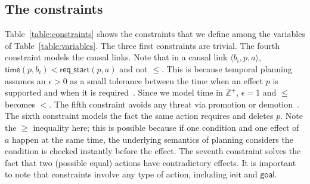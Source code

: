 \documentclass[runningheads]{llncs}
\newcommand{\tup}[1]{{\langle #1 \rangle}}
\newcommand{\dur}{\mathsf{dur}}    %
\newcommand{\obs}{\mathsf{obs}}    %
\newcommand{\start}{\mathsf{start}}%
\newcommand{\til}{\mathsf{til}}    %
\newcommand{\tim}{\mathsf{time}}   %
\newcommand{\reqs}{\mathsf{req\_{start}}} %
\newcommand{\ini}{\mathsf{init}}   %
\newcommand{\goal}{\mathsf{goal}}  %
\begin{document}


\subsection{The constraints}

Table~\ref{table:constraints} shows the constraints that we define among the variables of Table~\ref{table:variables}. The three first constraints are trivial. The fourth constraint models the causal links. Note that in a causal link $\tup{b_i,p,a}$, $\tim(p,b_i) < \reqs(p,a)$ and not $\leq$. This is because temporal planning assumes an $\epsilon > 0$ as a small tolerance between the time when an effect $p$ is supported and when it is required~\cite{fox2003pddl2}. Since we model time in $\mathbb{Z}^+$, $\epsilon=1$ and $\leq$ becomes $<$.
The fifth constraint avoids any threat via promotion or demotion~\cite{ghallab2004automated}. The sixth constraint models the fact the same action requires and deletes $p$. Note the $\geq$ inequality here; this is possible because if one condition and one effect of $a$ happen at the same time, the underlying semantics of planning considers the condition is checked instantly before the effect. The seventh constraint solves the fact that two (possible equal) actions have contradictory effects. It is important to note that constraints involve any type of action, including $\ini$ and $\goal$.
\end{document}
